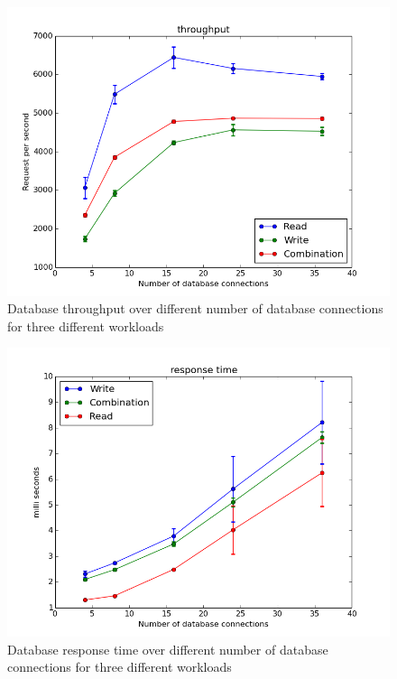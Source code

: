 \documentclass[11pt]{article}
\begin{document}
\begin{figure}[!ht]
  \includegraphics[height=0.4\textheight,page=1]{figures/db_throughput}
  \centering
  \caption{Database throughput over different number of database connections
  for three different workloads}
  \label{fig:db_thoughput}
\end{figure}

\begin{figure}[!ht]
  \includegraphics[height=0.4\textheight,page=1]{figures/db_response_time}
  \centering
  \caption{Database response time over different number of database connections
  for three different workloads}
  \label{fig:db_response_time}
\end{figure}
\end{document}

